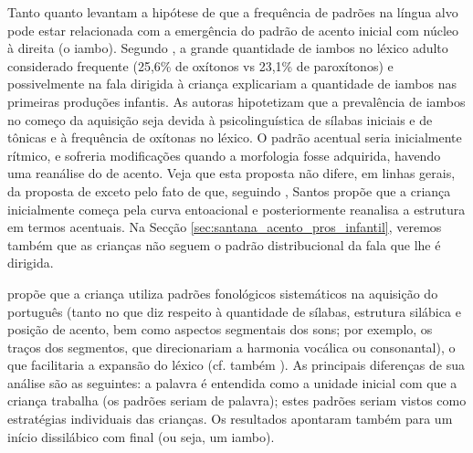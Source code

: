 \documentclass[output=paper]{LSP/langsci}
\begin{document}
Tanto \citet{ferreiragoncalcesbrum2011} quanto \citet{baia2012} levantam a hipótese de que a frequência de padrões na língua alvo pode estar relacionada com a emergência do padrão de acento inicial com núcleo à direita (o iambo). Segundo \citet{ferreiragoncalcesbrum2011}, a grande quantidade de iambos no léxico adulto considerado frequente (25,6\% de oxítonos vs 23,1\% de paroxítonos) e possivelmente na fala dirigida à criança explicariam a quantidade de iambos nas primeiras produções infantis. As autoras hipotetizam que a prevalência de iambos no começo da aquisição seja devida à  psicolinguística de sílabas iniciais e de tônicas e à frequência de oxítonas no léxico. O padrão acentual seria inicialmente rítmico, e sofreria modificações quando a morfologia fosse adquirida, havendo uma reanálise do  de acento. Veja que esta proposta não difere, em linhas gerais, da proposta de \citet{santos2001} exceto pelo fato de que, seguindo \citet{scarpa1997}, Santos propõe que a criança inicialmente começa pela curva entoacional e posteriormente reanalisa a estrutura em termos acentuais. Na Secção \ref{sec:santana_acento_pros_infantil}, veremos também que as crianças não seguem o padrão distribucional da fala que lhe é dirigida.

\citet{baia2012} propõe que a criança utiliza padrões fonológicos sistemáticos na aquisição do português (tanto no que diz respeito à quantidade de sílabas, estrutura silábica e posição de acento, bem como aspectos segmentais dos sons; por exemplo, os traços dos segmentos, que direcionariam a harmonia vocálica ou consonantal), o que facilitaria a expansão do léxico (cf. também \citealt{oliveiraguimaraes2012}). As principais diferenças de sua análise são as seguintes: a palavra é entendida como a unidade inicial com que a criança trabalha (os padrões seriam de palavra); estes padrões seriam vistos como estratégias individuais das crianças. Os resultados apontaram também para um início dissilábico com  final (ou seja, um iambo).
\end{document}
